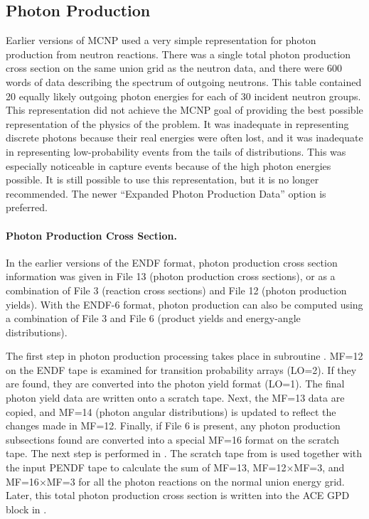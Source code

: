 \subsection{Photon Production}
\label{ssACER_photprod}

Earlier versions of MCNP used a very simple representation for
photon production from neutron reactions.
There was a single total photon production cross section on the same
union grid as the neutron data, and there were 600 words of data
describing the spectrum of outgoing neutrons.  This table contained
20 equally likely outgoing photon energies for each of 30
incident neutron groups.  This representation did not achieve
the MCNP goal of providing the best possible representation of
the physics of the problem.  It was inadequate in
representing discrete photons because their real energies were
often lost, and it was inadequate in representing low-probability
events from the tails of distributions.  This was especially
noticeable in capture events because of the high photon energies
possible.  It is still possible to use this representation,
but it is no longer recommended.  The newer ``Expanded
Photon Production Data'' option is preferred.

\paragraph{Photon Production Cross Section.}
In the earlier versions of the ENDF format, photon production
cross section information was given in File 13 (photon
production cross sections), or as a combination of File 3
(reaction cross sections) and File 12 (photon production yields).
With the ENDF-6 format, photon production can also be computed
using a combination of File 3 and File 6 (product yields and
energy-angle distributions).

The first step in photon production processing takes place in
subroutine .  MF=12 on the
ENDF tape is examined for transition probability arrays (LO=2).
If they are found, they are converted into the photon yield format
(LO=1).  The final photon yield data are written onto a scratch tape.
Next, the MF=13 data are copied, and MF=14 (photon angular distributions)
is updated to reflect the changes made in MF=12.  Finally, if
File 6 is present, any photon production subsections found are
converted into a special MF=16 format on the scratch tape.
The next step is performed in .  The scratch
tape from  is used together with the input PENDF
tape to calculate the sum of MF=13, MF=12$\times$MF=3, and
MF=16$\times$MF=3 for all the photon reactions on the normal
union energy grid.  Later, this total photon production cross
section is written into the ACE GPD block in .

